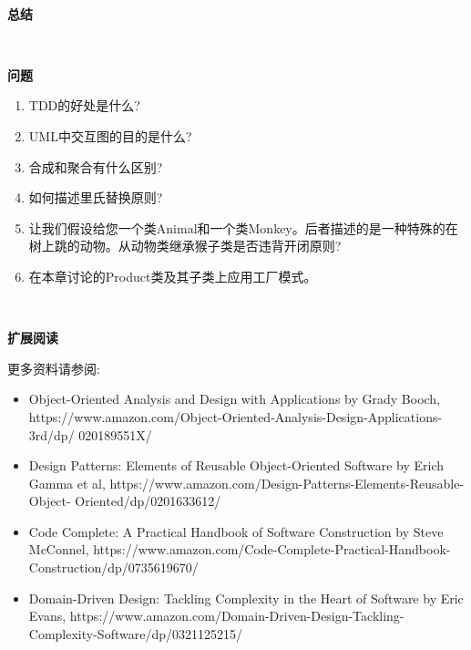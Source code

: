 \noindent\textbf{}\ \par
\textbf{总结} \ \par

\noindent\textbf{}\ \par
\textbf{问题} \ \par
\begin{enumerate}
	\item TDD的好处是什么?
	\item UML中交互图的目的是什么?
	\item 合成和聚合有什么区别?
	\item 如何描述里氏替换原则?
	\item 让我们假设给您一个类Animal和一个类Monkey。后者描述的是一种特殊的在树上跳的动物。从动物类继承猴子类是否违背开闭原则?
	\item 在本章讨论的Product类及其子类上应用工厂模式。
\end{enumerate}

\noindent\textbf{}\ \par
\textbf{扩展阅读} \ \par
更多资料请参阅: \par
\begin{itemize}
	\item Object-Oriented Analysis and Design with Applications by Grady Booch,  https:/​/www.​amazon.​com/​Object-​Oriented-​Analysis-​Design-​Applications-​3rd/​dp/	020189551X/​
	\item Design Patterns: Elements of Reusable Object-Oriented Software by Erich Gamma et	al, https:/​/​www.​amazon.​com/​Design-​Patterns-​Elements-​Reusable-​Object-	Oriented/​dp/​0201633612/​
	\item Code Complete: A Practical Handbook of Software Construction by Steve McConnel, https://www.amazon.com/Code-Complete-Practical-Handbook-Construction/dp/0735619670/
	\item Domain-Driven Design: Tackling Complexity in the Heart of Software by Eric	Evans,  https:/​/​www.​amazon.​com/​Domain-​Driven-​Design-​Tackling-
	Complexity-​Software/​dp/​0321125215/
\end{itemize}

\newpage










